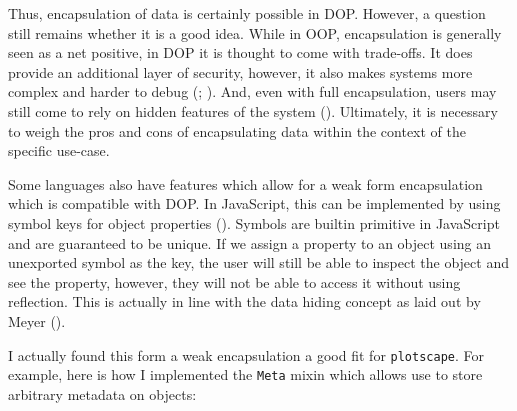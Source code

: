 \documentclass[
]{book}
\theoremstyle{definition}
\theoremstyle{definition}
\theoremstyle{definition}
\theoremstyle{definition}
\theoremstyle{remark}
\begin{document}
Thus, encapsulation of data is certainly possible in DOP. However, a question still remains whether it is a good idea. While in OOP, encapsulation is generally seen as a net positive, in DOP it is thought to come with trade-offs. It does provide an additional layer of security, however, it also makes systems more complex and harder to debug (; ). And, even with full encapsulation, users may still come to rely on hidden features of the system (). Ultimately, it is necessary to weigh the pros and cons of encapsulating data within the context of the specific use-case.

Some languages also have features which allow for a weak form encapsulation which is compatible with DOP. In JavaScript, this can be implemented by using symbol keys for object properties (). Symbols are builtin primitive in JavaScript and are guaranteed to be unique. If we assign a property to an object using an unexported symbol as the key, the user will still be able to inspect the object and see the property, however, they will not be able to access it without using reflection. This is actually in line with the data hiding concept as laid out by Meyer ().

I actually found this form a weak encapsulation a good fit for \texttt{plotscape}. For example, here is how I implemented the \texttt{Meta} mixin which allows use to store arbitrary metadata on objects:
\end{document}
